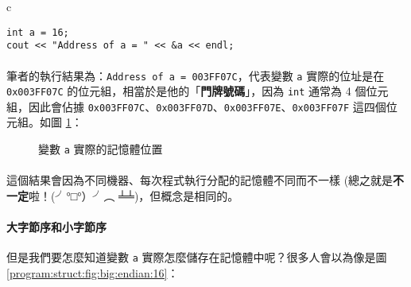 \documentclass[12pt,a4paper,oneside]{article}
\begin{document}
\begin{CJK}{UTF8}{bkai}
\begin{code}[h!]
\centering
\begin{tabular}{c}
\begin{lstlisting}
int a = 16;
cout << "Address of a = " << &a << endl;
\end{lstlisting}
\end{tabular}
\caption{印出 \lstinline!a! 的位址}
\label{program:struct:code:address}
\end{code}

\paragraph{}筆者的執行結果為：\lstinline!Address of a = 003FF07C!，代表變數 \lstinline!a! 實際的位址是在 \lstinline!0x003FF07C! 的位元組，相當於是他的「\textbf{門牌號碼}」，因為 \lstinline!int! 通常為 4 個位元組，因此會佔據 \lstinline!0x003FF07C!、\lstinline!0x003FF07D!、\lstinline!0x003FF07E!、\lstinline!0x003FF07F! 這四個位元組。如圖 \ref{program:struct:fig:int:address}：

\begin{figure}[h!]
\centering
{}
\caption{變數 \lstinline!a! 實際的記憶體位置}
\label{program:struct:fig:int:address}
\end{figure}

\paragraph{}這個結果會因為不同機器、每次程式執行分配的記憶體不同而不一樣 (總之就是\textbf{不一定}啦！(╯°□°）╯︵ ╧╧)，但概念是相同的。

\paragraph{大字節序和小字節序}但是我們要怎麼知道變數 \lstinline!a! 實際怎麼儲存在記憶體中呢？很多人會以為像是圖 \ref{program:struct:fig:big:endian:16}：


\end{CJK}
\end{document}
